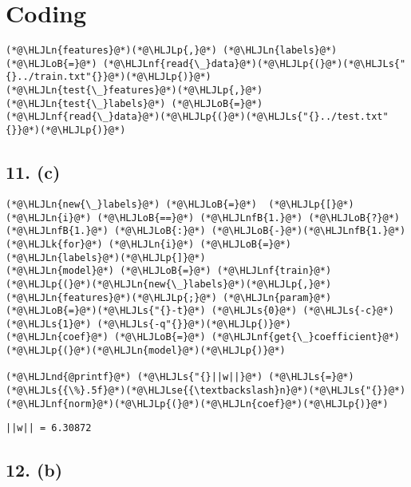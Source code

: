 \documentclass[12pt,a4paper]{article}
\newcommand{\HLJLk}[1]{\textcolor[RGB]{148,91,176}{\textbf{#1}}}
\newcommand{\HLJLn}[1]{#1}
\newcommand{\HLJLnd}[1]{\textcolor[RGB]{214,102,97}{#1}}
\newcommand{\HLJLnf}[1]{\textcolor[RGB]{66,102,213}{#1}}
\newcommand{\HLJLs}[1]{\textcolor[RGB]{201,61,57}{#1}}
\newcommand{\HLJLse}[1]{\textcolor[RGB]{59,151,46}{#1}}
\newcommand{\HLJLnfB}[1]{\textcolor[RGB]{59,151,46}{#1}}
\newcommand{\HLJLoB}[1]{\textcolor[RGB]{102,102,102}{\textbf{#1}}}
\newcommand{\HLJLp}[1]{#1}
\begin{document}
\section{Coding}


\begin{lstlisting}
(*@\HLJLn{features}@*)(*@\HLJLp{,}@*) (*@\HLJLn{labels}@*) (*@\HLJLoB{=}@*) (*@\HLJLnf{read{\_}data}@*)(*@\HLJLp{(}@*)(*@\HLJLs{"{}../train.txt"{}}@*)(*@\HLJLp{)}@*)
(*@\HLJLn{test{\_}features}@*)(*@\HLJLp{,}@*) (*@\HLJLn{test{\_}labels}@*) (*@\HLJLoB{=}@*) (*@\HLJLnf{read{\_}data}@*)(*@\HLJLp{(}@*)(*@\HLJLs{"{}../test.txt"{}}@*)(*@\HLJLp{)}@*)
\end{lstlisting}


\subsection{11. (c)}

\begin{lstlisting}
(*@\HLJLn{new{\_}labels}@*) (*@\HLJLoB{=}@*)  (*@\HLJLp{[}@*)(*@\HLJLn{i}@*) (*@\HLJLoB{==}@*) (*@\HLJLnfB{1.}@*) (*@\HLJLoB{?}@*) (*@\HLJLnfB{1.}@*) (*@\HLJLoB{:}@*) (*@\HLJLoB{-}@*)(*@\HLJLnfB{1.}@*) (*@\HLJLk{for}@*) (*@\HLJLn{i}@*) (*@\HLJLoB{=}@*) (*@\HLJLn{labels}@*)(*@\HLJLp{]}@*)
(*@\HLJLn{model}@*) (*@\HLJLoB{=}@*) (*@\HLJLnf{train}@*)(*@\HLJLp{(}@*)(*@\HLJLn{new{\_}labels}@*)(*@\HLJLp{,}@*) (*@\HLJLn{features}@*)(*@\HLJLp{;}@*) (*@\HLJLn{param}@*)(*@\HLJLoB{=}@*)(*@\HLJLs{"{}-t}@*) (*@\HLJLs{0}@*) (*@\HLJLs{-c}@*) (*@\HLJLs{1}@*) (*@\HLJLs{-q"{}}@*)(*@\HLJLp{)}@*)
(*@\HLJLn{coef}@*) (*@\HLJLoB{=}@*) (*@\HLJLnf{get{\_}coefficient}@*)(*@\HLJLp{(}@*)(*@\HLJLn{model}@*)(*@\HLJLp{)}@*)

(*@\HLJLnd{@printf}@*) (*@\HLJLs{"{}||w||}@*) (*@\HLJLs{=}@*) (*@\HLJLs{{\%}.5f}@*)(*@\HLJLse{{\textbackslash}n}@*)(*@\HLJLs{"{}}@*) (*@\HLJLnf{norm}@*)(*@\HLJLp{(}@*)(*@\HLJLn{coef}@*)(*@\HLJLp{)}@*)
\end{lstlisting}

\begin{lstlisting}
||w|| = 6.30872
\end{lstlisting}


\subsection{12. (b)}
\end{document}
